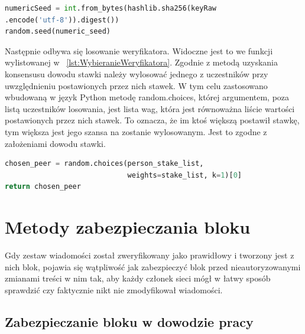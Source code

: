 \begin{lstlisting}[language=Python, extendedchars=true, caption={Ustawianie ziarna}, label={lst:UstawianieZiarna}]
numericSeed = int.from_bytes(hashlib.sha256(keyRaw
.encode('utf-8')).digest())
random.seed(numeric_seed)
\end{lstlisting}

Następnie odbywa się losowanie weryfikatora. Widoczne jest to we funkcji wylistowanej w \lstlistingname{~\ref{lst:WybieranieWeryfikatora}}. Zgodnie z metodą uzyskania konsensusu dowodu stawki należy wylosować jednego z uczestników przy uwzględnieniu postawionych przez nich stawek. W tym celu zastosowano wbudowaną w język Python metodę random.choices, której argumentem, poza listą uczestników losowania, jest lista wag, która jest równoważna liście wartości postawionych przez nich stawek. To oznacza, że im ktoś większą postawił stawkę, tym większa jest jego szansa na zostanie wylosowanym. Jest to zgodne z założeniami dowodu stawki.

\begin{lstlisting}[language=Python, extendedchars=true, caption={Wybieranie weryfikatora}, label={lst:WybieranieWeryfikatora}]
chosen_peer = random.choices(person_stake_list,
                             weights=stake_list, k=1)[0]
return chosen_peer
\end{lstlisting}

\section{Metody zabezpieczania bloku}
\label{sec:ZabezpieczenieBloku}

Gdy zestaw wiadomości został zweryfikowany jako prawidłowy i tworzony jest z nich blok, pojawia się wątpliwość jak zabezpieczyć blok przed nieautoryzowanymi zmianami treści w nim tak, aby każdy członek sieci mógł w łatwy sposób sprawdzić czy faktycznie nikt nie zmodyfikował wiadomości.

\subsection{Zabezpieczanie bloku w dowodzie pracy}
\label{ssec:ZabezpieczenieBlokuPoW}

